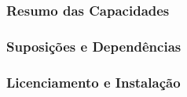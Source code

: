 \subsubsection{Resumo das Capacidades}

\subsubsection{Suposições e Dependências}

\subsubsection{Licenciamento e Instalação}

